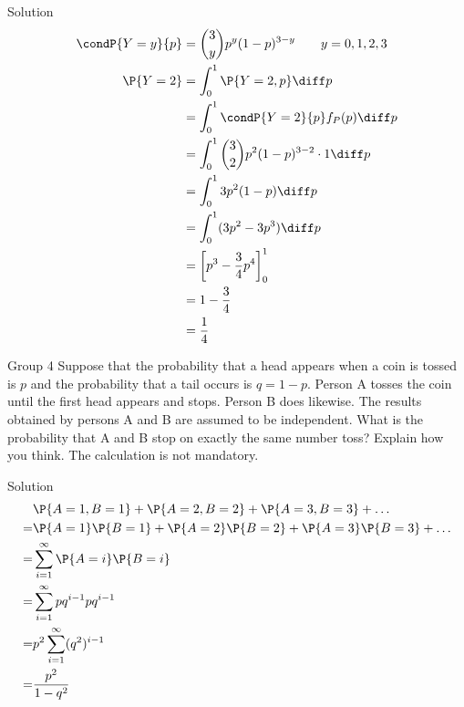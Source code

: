 \documentclass{article}
\theoremstyle{plain}
\theoremstyle{definition}
\theoremstyle{remark}
\begin{document}
\begin{solution}
    {Solution}
    \begin{align*}
        \condP{Y=y}{p}
        &= \binom{3}{y}p^y(1-p)^{3-y} \qquad y=0,1,2,3 \\
        \P{Y=2}
        &= \int_{0}^{1} \P{Y=2, p}\diff p \\
        &= \int_{0}^{1}\condP{Y=2}{p}f_P(p)\diff p \\
        &= \int_{0}^{1}\binom{3}{2}p^2(1-p)^{3-2}\cdot 1\diff p \\
        &= \int_{0}^{1}3p^2(1-p)\diff p \\
        &= \int_{0}^{1}(3p^2-3p^3)\diff p \\
        &= \left[p^3-\frac{3}{4}p^4\right]_{0}^{1} \\
        &= 1-\frac{3}{4} \\
        &= \frac{1}{4}
    \end{align*}
\end{solution}

\begin{problem}
    {Group 4}
    Suppose that the probability that a head appears when a coin is tossed is $p$ and the probability that a tail occurs is $q = 1 - p$. Person A tosses the coin until the first head appears and stops. Person B does likewise. The results obtained by persons A and B are assumed to be independent. What is the probability that A and B stop on exactly the same number toss? Explain how you think. The calculation is not mandatory.
\end{problem}

\begin{solution}
    {Solution}
    \begin{align*}
        &\P{A=1,B=1}+\P{A=2,B=2}+\P{A=3,B=3}+\ldots \\
        = &\P{A=1}\P{B=1}+\P{A=2}\P{B=2}+\P{A=3}\P{B=3}+\ldots \\
        = &\sum_{i=1}^{\infty}\P{A=i}\P{B=i} \\
        = &\sum_{i=1}^{\infty}pq^{i-1}pq^{i-1} \\
        = &p^2\sum_{i=1}^{\infty}(q^2)^{i-1} \\
        = &\frac{p^2}{1-q^2}
    \end{align*}
\end{solution}
\end{document}
